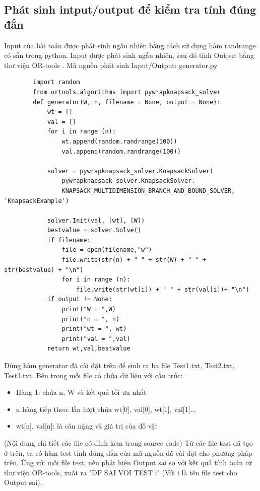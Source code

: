 \documentclass[12pt,a4paper]{report}
\begin{document}
    \subsection{Phát sinh intput/output để kiểm tra tính đúng đắn}
    Input của bài toán được phát sinh ngẫu nhiên bằng cách sử dụng hàm randrange có
    sẵn trong python. Input được phát sinh ngẫu nhiên, sau đó tính Output bằng 
    thư viện OR-tools . Mã nguồn phát sinh Input/Output:
    generator.py
    \begin{lstlisting}
        import random
        from ortools.algorithms import pywrapknapsack_solver   
        def generator(W, n, filename = None, output = None):
            wt = []
            val = []
            for i in range (n):
                wt.append(random.randrange(100))
                val.append(random.randrange(100))
        
            solver = pywrapknapsack_solver.KnapsackSolver(
                pywrapknapsack_solver.KnapsackSolver.
                KNAPSACK_MULTIDIMENSION_BRANCH_AND_BOUND_SOLVER, 'KnapsackExample')
        
            solver.Init(val, [wt], [W])
            bestvalue = solver.Solve()
            if filename:
                file = open(filename,"w")
                file.write(str(n) + " " + str(W) + " " + str(bestvalue) + "\n")
                for i in range (n):
                    file.write(str(wt[i]) + " " + str(val[i])+ "\n")
            if output != None:
                print("W = ",W)
                print("n = ", n)
                print("wt = ", wt)
                print("val = ",val)
            return wt,val,bestvalue
    \end{lstlisting}
    Dùng hàm generator đã cài đặt trên để sinh ra ba file Test1.txt, Test2.txt,
    Test3.txt. Bên trong mỗi file có chứa dữ liệu với cấu trúc:
    \begin{itemize}
        \item Hàng 1: chứa n, W và kết quả tối ưu nhất
        \item n hàng tiếp theo: lần lượt chứa wt[0], val[0], wt[1], val[1]... 
        \item wt[n], val[n]: là cân nặng và giá trị của đồ vật
    \end{itemize}
    (Nội dung chi tiết các file có đính kèm trong source code)
    Từ các file test đã tạo ở trên, ta có hàm test tính đúng đắn của mã nguồn đã 
    cài đặt cho phương pháp trên. Ứng với mỗi file test, nếu phát hiện Output sai
    so với kết quả tính toán từ thư viện OR-tools, xuất ra "DP SAI VOI TEST i" (Với i
    là tên file test cho Output sai).
\end{document}
